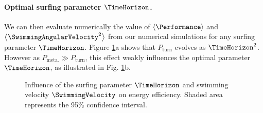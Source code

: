 \paragraph{Optimal surfing parameter $\TimeHorizon$.}
We can then evaluate numerically the value of $\left\langle \Performance \right\rangle$ and $\left\langle \SwimmingAngularVelocity^2 \right\rangle$ from our numerical simulations for any surfing parameter $\TimeHorizon$. 
Figure \ref{fig:energy_efficiency_rotation}a shows that $P_{\mathrm{turn}}$ evolves as $\TimeHorizon^2$.
However as $P_{\mathrm{meta.}} \gg P_{\mathrm{turn}}$, this effect weakly influences the optimal parameter $\TimeHorizon$, as illustrated in Fig. \ref{fig:energy_efficiency_rotation}b.
\begin{figure}%
	\centering
	
	\caption{
		Influence of the surfing parameter $\TimeHorizon$ and swimming velocity $\SwimmingVelocity$ on energy efficiency.
		Shaded area represents the 95\% confidence interval.
	}
	\label{fig:energy_efficiency_rotation}
\end{figure}

